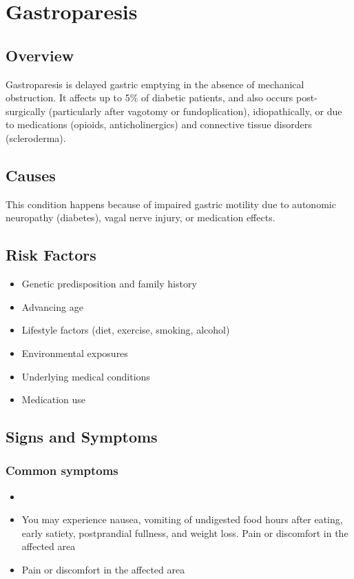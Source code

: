 \chapter{Gastroparesis}
\label{sec:Gastroparesis}

\section{Overview}
Gastroparesis is delayed gastric emptying in the absence of mechanical obstruction. It affects up to 5\% of diabetic patients, and also occurs post-surgically (particularly after vagotomy or fundoplication), idiopathically, or due to medications (opioids, anticholinergics) and connective tissue disorders (scleroderma).
\section{Causes}
This condition happens because of impaired gastric motility due to autonomic neuropathy (diabetes), vagal nerve injury, or medication effects.     
\section{Risk Factors}

\begin{itemize}[noitemsep]
  \item Genetic predisposition and family history
  \item Advancing age
  \item Lifestyle factors (diet, exercise, smoking, alcohol)
  \item Environmental exposures
  \item Underlying medical conditions
  \item Medication use
\end{itemize}
\section{Signs and Symptoms}

\subsection{Common symptoms}
\begin{itemize}[noitemsep]
  \item \item You may experience nausea, vomiting of undigested food hours after eating, early satiety, postprandial fullness, and weight loss. Pain or discomfort in the affected area    \item Pain or discomfort in the affected area
  \end{itemize}

